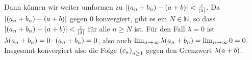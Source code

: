 \documentclass[german,12pt]{homework}
\newcommand{\NN}{\mathbb{N}}
\DeclarePairedDelimiter{\absolute}{\lvert}{\rvert}
\DeclarePairedDelimiter{\enbrace}{(}{)}
\begin{document}
\begin{enumerate}
        Dann können wir weiter umformen zu \(\absolute*{\enbrace*{a_n + b_n} -
        \enbrace*{a + b}} < \frac{\varepsilon}{\absolute*{\lambda}}\). Da
        \(\absolute*{\enbrace*{a_n + b_n} - \enbrace*{a + b}}\) gegen \(0\)
        konvergiert, gibt es ein \(N \in \NN\), so dass
        \(\absolute*{\enbrace*{a_n + b_n} - \enbrace*{a + b}} <
        \frac{\varepsilon}{\absolute*{\lambda}}\) für alle \(n \ge N\) ist. Für
        den Fall \(\lambda = 0\) ist \(\lambda\enbrace*{a_n + b_n} = 0 \cdot
        \enbrace*{a_n + b_n} = 0\), also auch \(\lim_{n \to
        \infty}\lambda\enbrace*{a_n + b_n} = \lim_{n \to \infty}0 = 0\).
        Insgesamt konvergiert also die Folge \(\enbrace*{c_n}_{n \ge 1}\) gegen
        den Grenzwert \(\lambda\enbrace*{a + b}\).
    \end{enumerate}
\end{document}
